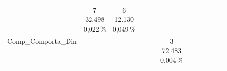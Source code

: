 \begin{table}[H]
{\begin{tabular}{lcccccccccc}
			                     & \shortstack{7                                                                                                                                                             \\ 32.498 \\ 0,022\,\%}
			                     & \shortstack{6                                                                                                                                                             \\ 12.130 \\ 0,049\,\%} \\
			\cmidrule(lr){2-11}
			\shortstack{Comp\_Comporta\_Din                                                                                                                                                                  \\ \,\\ \, }
			                     & \shortstack{-                                                                                                                                                             \\ \,\\ \, }
			                     & \shortstack{-                                                                                                                                                             \\ \,\\ \, }
			                     & \shortstack{-                                                                                                                                                             \\ \,\\ \, }
			                     & \shortstack{-                                                                                                                                                             \\ \,\\ \, }
			                     & \shortstack{3                                                                                                                                                             \\ 72.483\\ 0,004\,\%}
			                     & \shortstack{-                                                                                                                                                             \\ \,\\ \, }

\end{tabular}}
\end{table}
